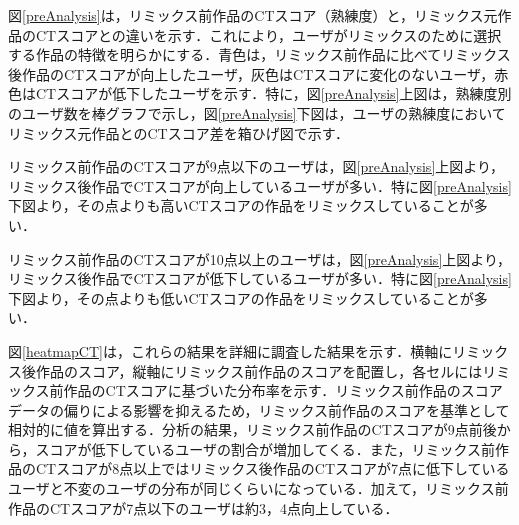 \documentclass[submit,techrep,noauthor]{ipsj}
\newcommand{\memo}[1]{\colorbox{magenta!30}{\textbf{MEMO}}{\color{red!50}\textbf{[#1]}}}
\begin{document}
図\ref{preAnalysis}は，リミックス前作品のCTスコア（熟練度）と，リミックス元作品のCTスコアとの違いを示す．これにより，ユーザがリミックスのために選択する作品の特徴を明らかにする．青色は，リミックス前作品に比べてリミックス後作品のCTスコアが向上したユーザ，灰色はCTスコアに変化のないユーザ，赤色はCTスコアが低下したユーザを示す．特に，図\ref{preAnalysis}上図は，熟練度別のユーザ数を棒グラフで示し，図\ref{preAnalysis}下図は，ユーザの熟練度においてリミックス元作品とのCTスコア差を箱ひげ図で示す．


リミックス前作品のCTスコアが9点以下のユーザは，図\ref{preAnalysis}上図より，リミックス後作品でCTスコアが向上しているユーザが多い．特に図\ref{preAnalysis}下図より，その点よりも高いCTスコアの作品をリミックスしていることが多い．

リミックス前作品のCTスコアが10点以上のユーザは，図\ref{preAnalysis}上図より，リミックス後作品でCTスコアが低下しているユーザが多い．特に図\ref{preAnalysis}下図より，その点よりも低いCTスコアの作品をリミックスしていることが多い．

図\ref{heatmapCT}は，これらの結果を詳細に調査した結果を示す．横軸にリミックス後作品のスコア，縦軸にリミックス前作品のスコアを配置し，各セルにはリミックス前作品のCTスコアに基づいた分布率を示す．リミックス前作品のスコアデータの偏りによる影響を抑えるため，リミックス前作品のスコアを基準として相対的に値を算出する．分析の結果，リミックス前作品のCTスコアが9点前後から，スコアが低下しているユーザの割合が増加してくる．また，リミックス前作品のCTスコアが8点以上ではリミックス後作品のCTスコアが7点に低下しているユーザと不変のユーザの分布が同じくらいになっている．加えて，リミックス前作品のCTスコアが7点以下のユーザは約3，4点向上している．



\end{document}
